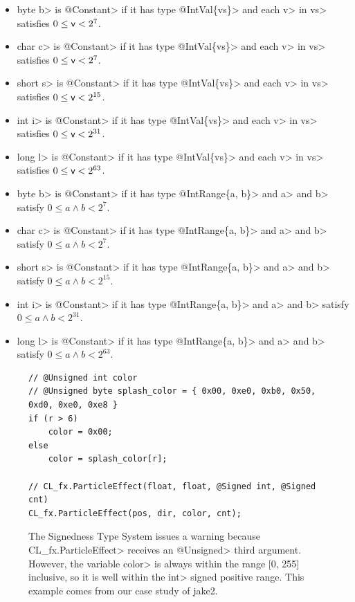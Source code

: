 \begin{itemize}
\item \<byte b> is \<@Constant> if it has type \<@IntVal\{vs\}> and each
\<v> in \<vs> satisfies $0 \leq \<v> < 2^7$.
\item \<char c> is \<@Constant> if it has type \<@IntVal\{vs\}> and each
\<v> in \<vs> satisfies $0 \leq \<v> < 2^7$.
\item \<short s> is \<@Constant> if it has type \<@IntVal\{vs\}> and each
\<v> in \<vs> satisfies $0 \leq \<v> < 2^{15}$.
\item \<int i> is \<@Constant> if it has type \<@IntVal\{vs\}> and each
\<v> in \<vs> satisfies $0 \leq \<v> < 2^{31}$.
\item \<long l> is \<@Constant> if it has type \<@IntVal\{vs\}> and each
\<v> in \<vs> satisfies $0 \leq \<v> < 2^{63}$.
\item \<byte b> is \<@Constant> if it has type \<@IntRange\{a, b\}> and
\<a> and \<b> satisfy $0 \leq a \land b < 2^7$.
\item \<char c> is \<@Constant> if it has type \<@IntRange\{a, b\}> and
\<a> and \<b> satisfy $0 \leq a \land b < 2^7$.
\item \<short s> is \<@Constant> if it has type \<@IntRange\{a, b\}> and
\<a> and \<b> satisfy $0 \leq a \land b < 2^{15}$.
\item \<int i> is \<@Constant> if it has type \<@IntRange\{a, b\}> and
\<a> and \<b> satisfy $0 \leq a \land b < 2^{31}$.
\item \<long l> is \<@Constant> if it has type \<@IntRange\{a, b\}> and
\<a> and \<b> satisfy $0 \leq a \land b < 2^{63}$.
\end{itemize}

\begin{figure}[h]
\begin{lstlisting}
// @Unsigned int color
// @Unsigned byte splash_color = { 0x00, 0xe0, 0xb0, 0x50, 0xd0, 0xe0, 0xe8 }
if (r > 6)
    color = 0x00;
else
    color = splash_color[r];

// CL_fx.ParticleEffect(float, float, @Signed int, @Signed cnt)
CL_fx.ParticleEffect(pos, dir, color, cnt);
\end{lstlisting}
\vspace{-10pt}
\caption{
  The Signedness Type System issues a warning because
\<CL\_fx.ParticleEffect> receives an \<@Unsigned> third argument.
However, the variable \<color> is always within the range
[0, 255] inclusive, so it is well within the \<int> signed
positive range. This example comes from our case study
of jake2.
}
\label{fig:compatible}
\end{figure}


